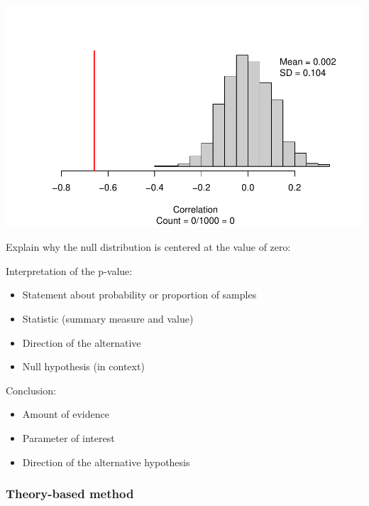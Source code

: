\documentclass[
]{report}
\begin{document}
\begin{center}\includegraphics[width=0.7\linewidth]{13-LN013-regression_files/figure-latex/unnamed-chunk-6-1} \end{center}

Explain why the null distribution is centered at the value of zero:

\vspace{0.5in}

Interpretation of the p-value:

\begin{itemize}
\item
  Statement about probability or proportion of samples
\item
  Statistic (summary measure and value)
\item
  Direction of the alternative
\item
  Null hypothesis (in context)
\end{itemize}

\vspace{0.8in}

Conclusion:

\begin{itemize}
\item
  Amount of evidence
\item
  Parameter of interest
\item
  Direction of the alternative hypothesis
\end{itemize}

\vspace{0.6in}

\newpage

\hypertarget{theory-based-method-5}{%
\subsubsection*{Theory-based method}\label{theory-based-method-5}}
\end{document}
